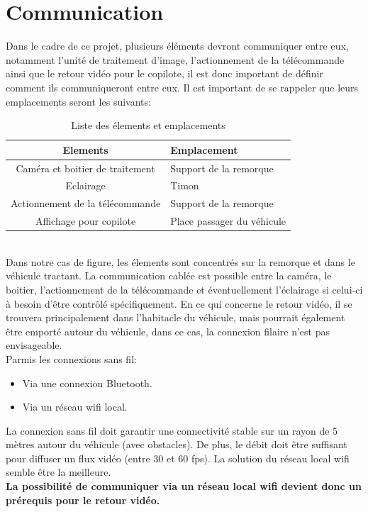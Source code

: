 \section{Communication}
Dans le cadre de ce projet, plusieurs éléments devront communiquer entre eux, notamment l'unité de traitement d'image,
l'actionnement de la télécommande ainsi que le retour vidéo pour le copilote, il est donc important de définir comment ils communiqueront entre eux.
Il est important de se rappeler que leurs emplacements seront les suivants:\\
\begin{table}[h]
    \begin{center}
        \caption{Liste des élements et emplacements}
        \begin{tabular}{|c|l|}
            Elements                        & Emplacement                \\ \hline
            Caméra et boitier de traitement & Support de la remorque     \\
            Eclairage                       & Timon                      \\
            Actionnement de la télécommande & Support de la remorque     \\
            Affichage pour copilote         & Place passager du véhicule
        \end{tabular}
    \end{center}
\end{table}\\
Dans notre cas de figure, les élements sont concentrés sur la remorque et dans le véhicule tractant. La communication cablée est possible
entre la caméra, le boitier, l'actionnement de la télécommande et éventuellement l'éclairage si celui-ci à besoin d'être contrôlé spécifiquement.
En ce qui concerne le retour vidéo, il se trouvera principalement dans l'habitacle du véhicule, mais pourrait également être emporté autour du véhicule,
dans ce cas, la connexion filaire n'est pas envisageable.\\
Parmis les connexions sans fil:
\begin{itemize}
    \item Via une connexion Bluetooth.
    \item Via un réseau \Gls{wifi} local.
\end{itemize}
La connexion sans fil doit garantir une connectivité stable sur un rayon de 5 mètres autour du véhicule (avec obstacles). De plus, le débit doit être
suffisant pour diffuser un flux vidéo (entre 30 et 60 \Gls{fps}). La solution du réseau local \Gls{wifi} semble être la meilleure.\\
\textbf{La possibilité de communiquer via un réseau local \Gls{wifi} devient donc un prérequis pour le retour vidéo.}
